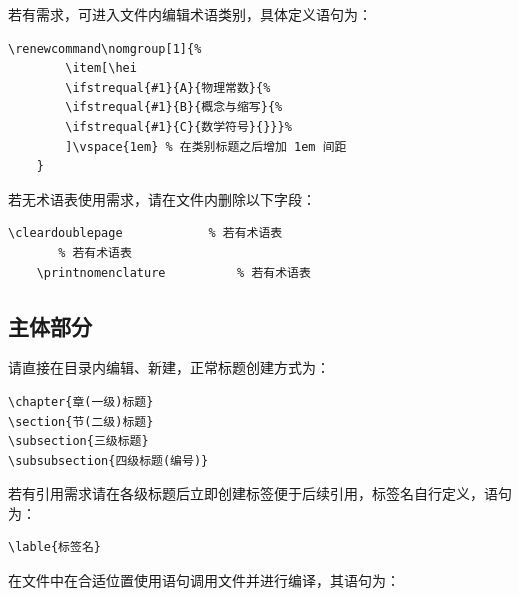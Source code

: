若有需求，可进入文件内编辑术语类别，具体定义语句为：
\begin{lstlisting}[language={[LaTeX]TeX}]
    \renewcommand\nomgroup[1]{%
        \item[\hei
        \ifstrequal{#1}{A}{物理常数}{%
        \ifstrequal{#1}{B}{概念与缩写}{%
        \ifstrequal{#1}{C}{数学符号}{}}}%
        ]\vspace{1em} % 在类别标题之后增加 1em 间距
    }
\end{lstlisting}

若无术语表使用需求，请在文件内删除以下字段：

\begin{lstlisting}[language={[LaTeX]TeX}]
    \cleardoublepage            % 若有术语表
       % 若有术语表
    \printnomenclature          % 若有术语表
\end{lstlisting}

\subsection{主体部分}
请直接在目录内编辑、新建，正常标题创建方式为：
\begin{lstlisting}[language={[LaTeX]TeX}]
\chapter{章(一级)标题}
\section{节(二级)标题}
\subsection{三级标题}
\subsubsection{四级标题(编号)}
\end{lstlisting}

若有引用需求请在各级标题后立即创建标签便于后续引用，标签名自行定义，语句为：
\begin{lstlisting}[language={[LaTeX]TeX}]
\lable{标签名}
\end{lstlisting}


在文件中在合适位置使用语句调用文件并进行编译，其语句为：
\begin{lstlisting}[language={[LaTeX]TeX}]

\end{lstlisting}

